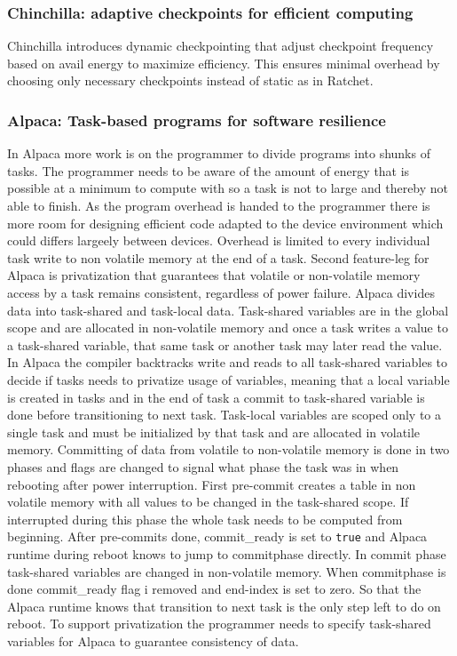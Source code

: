 \documentclass[article,a4paper]{IEEEtran}
\begin{document}
\subsubsection{Chinchilla: adaptive checkpoints for efficient computing}
Chinchilla introduces dynamic checkpointing that adjust checkpoint frequency based on avail energy to maximize efficiency. This ensures minimal overhead by choosing only necessary checkpoints instead of static as in Ratchet. 
\subsubsection{Alpaca: Task-based programs for software resilience}
In Alpaca more work is on the programmer to divide programs into shunks of tasks. The programmer needs to be aware of the amount of energy that is possible at a minimum to compute with so a task is not to large and thereby not able to finish. As the program overhead is handed to the programmer there is more room for designing efficient code adapted to the device environment which could differs largeely between devices. Overhead is limited to every individual task write to non volatile memory at the end of a task. Second feature-leg for Alpaca is privatization that guarantees that volatile or non-volatile memory access by a task remains consistent, regardless of power failure. 
\newline\newline
Alpaca divides data into task-shared and task-local data. Task-shared variables are in the global scope and are allocated in non-volatile memory and once a task writes a value to a task-shared variable, that same task or another task may later read the value. In Alpaca the compiler backtracks write and reads to all task-shared variables to decide if tasks needs to privatize usage of variables, meaning that a local variable is created in tasks and in the end of task a commit to task-shared variable is done before transitioning to next task. Task-local variables are scoped only to a single task and must be initialized by that task and are allocated in volatile memory.
\newline\newline
Committing of data from volatile to non-volatile memory is done in two phases and flags are changed to signal what phase the task was in when rebooting after power interruption. First pre-commit creates a table in non volatile memory with all values to be changed in the task-shared scope. If interrupted during this phase the whole task needs to be computed from beginning. After pre-commits done, commit\_ready is set to \texttt{true} and Alpaca runtime during reboot knows to jump to commitphase directly. In commit phase task-shared variables are changed in non-volatile memory. When commitphase is done commit\_ready flag i removed and end-index is set to zero. So that the Alpaca runtime knows that transition to next task is the only step left to do on reboot. To support privatization the programmer needs to specify task-shared variables for Alpaca to guarantee consistency of data.
\end{document}
